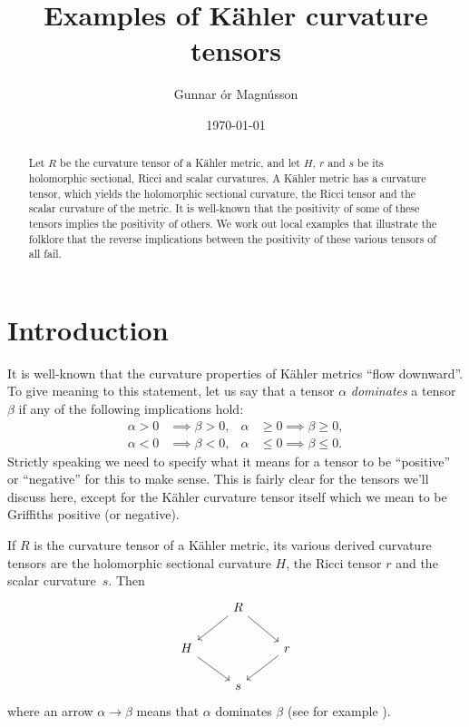 \documentclass[10pt,a4paper]{amsart}
\author{Gunnar \TH\'or Magn\'usson}
\date{\today}
\title{Examples of K\"ahler curvature tensors}
\theoremstyle{definition}
\begin{document}
\begin{abstract}
Let $R$ be the curvature tensor of a K\"ahler metric, and let $H$, $r$ and $s$
be its holomorphic sectional, Ricci and scalar curvatures.
A K\"ahler metric has a curvature tensor, which yields the holomorphic sectional
curvature, the Ricci tensor and the scalar curvature of the metric.
It is well-known that the positivity of some of these tensors implies the
positivity of others.
We work out local examples that illustrate the folklore that the reverse
implications between the positivity of these various tensors of all fail.
\end{abstract}

\maketitle

\section*{Introduction}

It is well-known that the curvature properties of K\"ahler metrics ``flow
downward''.
To give meaning to this statement,
let us say that a tensor $\alpha$ \emph{dominates} a tensor $\beta$
if any of the following implications hold:
\begin{align*}
\alpha > 0 &\implies \beta > 0,
&
\alpha &\geq 0 \implies \beta \geq 0,
\\
\alpha < 0 &\implies \beta < 0,
&
\alpha &\leq 0 \implies \beta \leq 0.
\end{align*}
Strictly speaking we need to specify what it means for a tensor to be
``positive'' or ``negative'' for this to make sense.
This is fairly clear for the tensors we'll discuss here, except for the
K\"ahler curvature tensor itself which we mean to be Griffiths positive (or
negative).

If $R$ is the curvature tensor of a K\"ahler metric, its various derived
curvature tensors are the holomorphic sectional curvature $H$, the Ricci
tensor $r$ and the scalar curvature~$s$.
Then
$$
\begin{tikzcd}
& R \ar[dl] \ar[dr] &
\\
H \ar[dr] & & r \ar[dl]
\\
& s &
\end{tikzcd}
$$
where an arrow $\alpha \to \beta$ means that $\alpha$ dominates $\beta$
(see for example \cite{zheng2000complex}).
\end{document}
